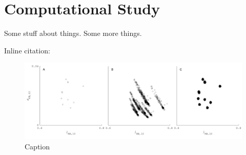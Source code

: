 \chapter{Computational Study}
\label{ComputationalStudyChapter}

Some stuff about things.\cite{example-citation} Some more things. 

Inline citation: 

\begin{figure}[hbp]
\includegraphics[width=\textwidth]{CompStudyFigs/hypI.pdf}
\caption{Caption}
\label{fig:hypI}
\end{figure}


\blindtext
